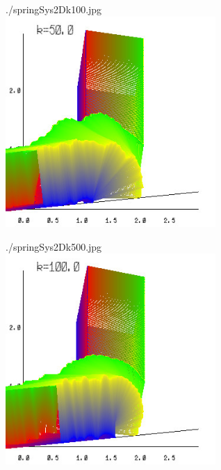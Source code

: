 \documentclass[12pt, a4paper]{article}
\begin{document}
\begin{center}
./springSys2Dk100.jpg\\
\includegraphics[width=8cm]{./springSys2Dk50.jpg}
\end{center} 
\newpage
\begin{center}
./springSys2Dk500.jpg\\
\includegraphics[width=8cm]{./springSys2Dk100.jpg}
\end{center} 
\end{document}
